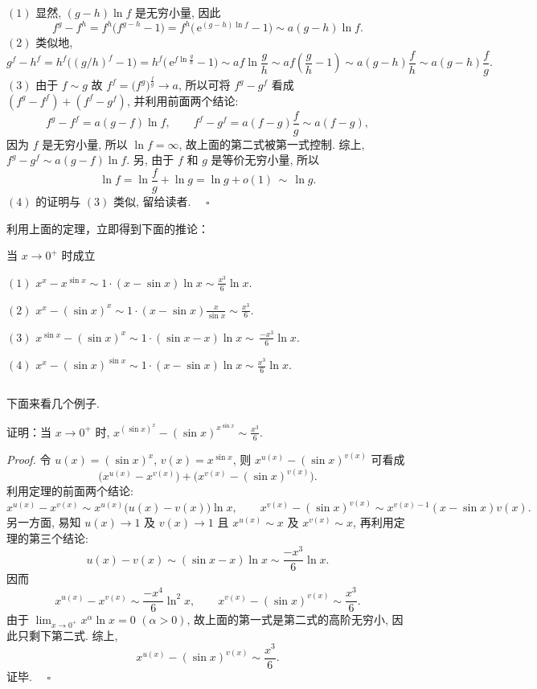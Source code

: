 $(1)$ 显然, $(g-h)\ln f$ 是无穷小量, 因此
\[
f^{g}-f^{h}=f^{h}\big(f^{g-h}-1\big)=f^{h}\big(\,\mathrm{e}^{(g-h)\ln f}-1\big)\sim a(g-h)\ln f.~
\]
 $(2)$ 类似地, 
\[g^{f}-h^{f}=h^{f}\big((g/h)^{f}-1\big)=h^{f}\big(\,\mathrm{e}^{f\ln\frac{g}{h}}-1\big)\sim af\ln\frac{g}{h}\sim af\left(\frac{g}{h}-1\right)\sim a(g-h)\frac{f}{h}\sim a(g-h)\frac{f}{g}.~\]
 $(3)$ 由于 $f\sim g$ 故 $f^{f}=\big(f^{g}\big)^{\frac{f}{g}}\to a$,
所以可将 $f^{g}-g^{f}$ 看成 $(f^{g}-f^{f})+(f^{f}-g^{f})$, 并利用前面两个结论: 
\[
f^{g}-f^{f}=a(g-f)\ln f,\qquad f^{f}-g^{f}=a(f-g)\frac{f}{g}\sim a(f-g),~
\]
因为 $f$ 是无穷小量, 所以 $\ln f=\infty$, 故上面的第二式被第一式控制. 综上, $f^{g}-g^{f}\sim a(g-f)\ln f.$ 另, 由于 $f$ 和 $g$ 是等价无穷小量, 所以
\[
\ln f=\ln\frac{f}{g}+\ln g=\ln g+o(1)\,\sim\,\ln g.~
\]
$(4)$ 的证明与 $(3)$ 类似, 留给读者. $\quad\square$

利用上面的定理，立即得到下面的推论：

\begin{corollary}{}
当 $x\to0^+$ 时成立

$(1)$ $x^{x}-x^{\sin x}\sim1\cdot(x-\sin x)\ln x\sim\frac{x^{3}}{6}\ln x.$

$(2)$ $x^{x}-(\sin x)^{x}\sim1\cdot(x-\sin x)\frac{x}{\sin x}\sim\frac{x^{3}}{6}.$

$(3)$ $x^{\sin x}-(\sin x)^{x}\sim1\cdot(\sin x-x)\ln x\sim\,\frac{-x^{3}}{6}\ln x.$

$(4)$ $x^{x}-(\sin x)^{\sin x}\sim1\cdot(x-\sin x)\ln x\sim\frac{x^{3}}{6}\ln x.$
\end{corollary}

$$~$$ 

下面来看几个例子.

\begin{example}{}
证明：当 $x\to0^+$ 时, $x^{(\sin x)^{x}}-(\sin x)^{x^{\sin x}}\sim\frac{x^{3}}{6}.$ 
\end{example}
\textsl{Proof.} 令 $u(x)=(\sin x)^{x}$, $v(x)=x^{\sin x}$, 则 $x^{u(x)}-(\sin x)^{v(x)}$
可看成 $$\big(x^{u(x)}-x^{v(x)}\big)+\big(x^{v(x)}-(\sin x)^{v(x)}\big).~$$
利用定理的前面两个结论: 
\[
x^{u(x)}-x^{v(x)}\sim x^{u(x)}\big(u(x)-v(x)\big)\ln x,\qquad x^{v(x)}-(\sin x)^{v(x)}\sim x^{v(x)-1}(x-\sin x)v(x).~
\]
另一方面, 易知 $u(x)\to1$ 及 $v(x)\to1$ 且 $x^{u(x)}\sim x$ 及 $x^{v(x)}\sim x$, 再利用定理的第三个结论: 
\[
u(x)-v(x)\sim(\sin x-x)\ln x\sim\frac{-x^{3}}{6}\ln x.~
\]
因而 
\[
x^{u(x)}-x^{v(x)}\sim\frac{-x^{4}}{6}\ln^{2}x,\qquad x^{v(x)}-(\sin x)^{v(x)}\sim\frac{x^{3}}{6}.~
\]
由于 ${\displaystyle \lim_{x\to0^+}x^{\alpha}\ln x=0}$ $(\alpha>0)$,
故上面的第一式是第二式的高阶无穷小, 因此只剩下第二式. 综上, $$x^{u(x)}-(\sin x)^{v(x)}\sim\frac{x^{3}}{6}.~$$  证毕. $\quad\square$

